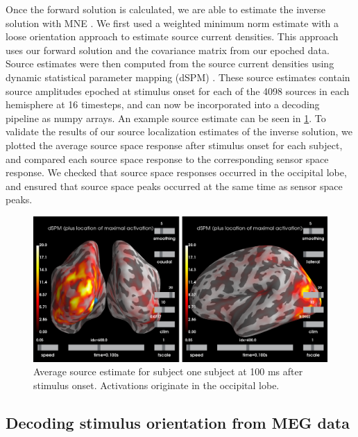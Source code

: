 \documentclass[../main.tex]{subfiles}
\begin{document}
Once the forward solution is calculated, we are able to estimate the inverse solution with MNE \citep{mne}. We first used a weighted minimum norm estimate \citep{fuchs_1999, lin_2006} with a loose orientation approach \citep{lin_2005} to estimate source current densities. This approach uses our forward solution and the covariance matrix from our epoched data. Source estimates were then computed from the source current densities using dynamic statistical parameter mapping (dSPM) \citep{DALE200055}. These source estimates contain source amplitudes epoched at stimulus onset for each of the 4098 sources in each hemisphere at 16 timesteps, and can now be incorporated into a decoding pipeline as numpy arrays. An example source estimate can be seen in \ref{source_ka}. To validate the results of our source localization estimates of the inverse solution, we plotted the average source space response after stimulus onset for each subject, and compared each source space response to the corresponding sensor space response. We checked that source space responses occurred in the occipital lobe, and ensured that source space peaks occurred at the same time as sensor space peaks.

\begin{figure}
    \centering
    \includegraphics[scale=0.4]{figures/methods/source_loc_KA.png}
    \caption{Average source estimate for subject one subject at 100 ms after stimulus onset. Activations originate in the occipital lobe.}
    \label{source_ka}
\end{figure}

\subsection{Decoding stimulus orientation from MEG data}
\end{document}
